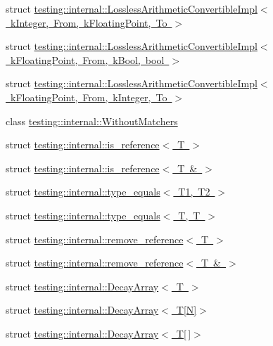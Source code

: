 \begin{DoxyCompactItemize}
\item 
struct \mbox{\hyperlink{structtesting_1_1internal_1_1_lossless_arithmetic_convertible_impl_3_01k_integer_00_01_from_00_01k_floating_point_00_01_to_01_4}{testing\+::internal\+::\+Lossless\+Arithmetic\+Convertible\+Impl$<$ k\+Integer, From, k\+Floating\+Point, To $>$}}
\item 
struct \mbox{\hyperlink{structtesting_1_1internal_1_1_lossless_arithmetic_convertible_impl_3_01k_floating_point_00_01_from_00_01k_bool_00_01bool_01_4}{testing\+::internal\+::\+Lossless\+Arithmetic\+Convertible\+Impl$<$ k\+Floating\+Point, From, k\+Bool, bool $>$}}
\item 
struct \mbox{\hyperlink{structtesting_1_1internal_1_1_lossless_arithmetic_convertible_impl_3_01k_floating_point_00_01_from_00_01k_integer_00_01_to_01_4}{testing\+::internal\+::\+Lossless\+Arithmetic\+Convertible\+Impl$<$ k\+Floating\+Point, From, k\+Integer, To $>$}}
\item 
class \mbox{\hyperlink{classtesting_1_1internal_1_1_without_matchers}{testing\+::internal\+::\+Without\+Matchers}}
\item 
struct \mbox{\hyperlink{structtesting_1_1internal_1_1is__reference}{testing\+::internal\+::is\+\_\+reference$<$ T $>$}}
\item 
struct \mbox{\hyperlink{structtesting_1_1internal_1_1is__reference_3_01_t_01_6_01_4}{testing\+::internal\+::is\+\_\+reference$<$ T \& $>$}}
\item 
struct \mbox{\hyperlink{structtesting_1_1internal_1_1type__equals}{testing\+::internal\+::type\+\_\+equals$<$ T1, T2 $>$}}
\item 
struct \mbox{\hyperlink{structtesting_1_1internal_1_1type__equals_3_01_t_00_01_t_01_4}{testing\+::internal\+::type\+\_\+equals$<$ T, T $>$}}
\item 
struct \mbox{\hyperlink{structtesting_1_1internal_1_1remove__reference}{testing\+::internal\+::remove\+\_\+reference$<$ T $>$}}
\item 
struct \mbox{\hyperlink{structtesting_1_1internal_1_1remove__reference_3_01_t_01_6_01_4}{testing\+::internal\+::remove\+\_\+reference$<$ T \& $>$}}
\item 
struct \mbox{\hyperlink{structtesting_1_1internal_1_1_decay_array}{testing\+::internal\+::\+Decay\+Array$<$ T $>$}}
\item 
struct \mbox{\hyperlink{structtesting_1_1internal_1_1_decay_array_3_01_t[_n]_4}{testing\+::internal\+::\+Decay\+Array$<$ T\mbox{[}\+N\mbox{]}$>$}}
\item 
struct \mbox{\hyperlink{structtesting_1_1internal_1_1_decay_array_3_01_t[]_4}{testing\+::internal\+::\+Decay\+Array$<$ T\mbox{[}$\,$\mbox{]}$>$}}

\end{DoxyCompactItemize}
